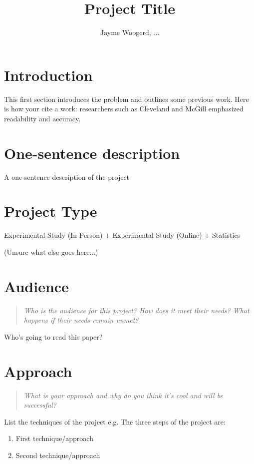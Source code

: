\documentclass{proc}
\begin{document}
\title{Project Title}

\author{Jayme Woogerd, ...}

\maketitle

\section{Introduction}

This first section introduces the problem and outlines some previous work.  Here is how your cite a work: researchers such as Cleveland and McGill \cite{cleveland1984graphical} emphasized readability and accuracy.

\section{One-sentence description}

A one-sentence description of the project

\section{Project Type}

Experimental Study (In-Person) + Experimental Study (Online) + Statistics

(Unsure what else goes here...)

\section{Audience} 
\begin{quote}
\textit {Who is the audience for this project? 
How does it meet their needs? 
What happens if their needs remain unmet?}
\end{quote}

Who's going to read this paper?

\section{Approach}
\begin{quote}
\textit {What is your approach and why do you think it's cool and will be successful?}
\end{quote}

List the techniques of the project e.g.
The three steps of the project are:
\begin{enumerate}
\item First technique/approach
\item Second technique/approach
\end{enumerate}
\end{document}
